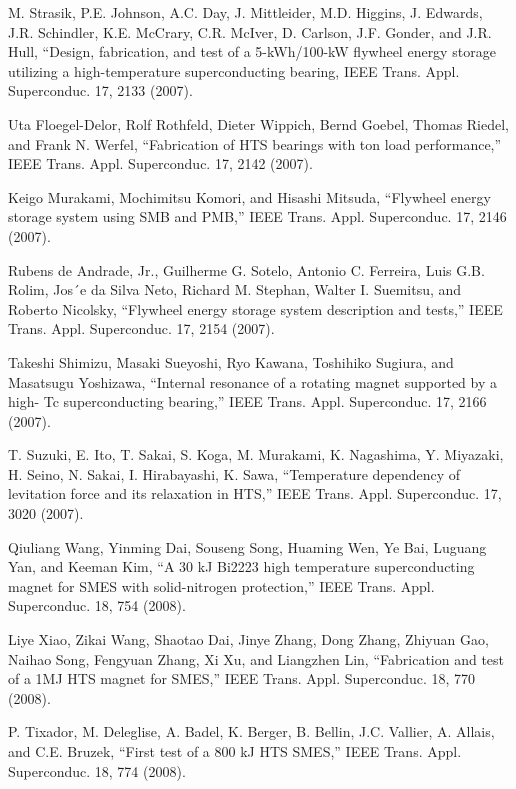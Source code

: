 \noindent [9.103] M. Strasik, P.E. Johnson, A.C. Day, J. Mittleider, M.D. Higgins, J. Edwards, J.R.
Schindler, K.E. McCrary, C.R. McIver, D. Carlson, J.F. Gonder, and J.R. Hull,
``Design, fabrication, and test of a 5-kWh/100-kW flywheel energy storage utilizing
a high-temperature superconducting bearing, IEEE Trans. Appl. Superconduc.
17, 2133 (2007).

\noindent [9.104] Uta Floegel-Delor, Rolf Rothfeld, Dieter Wippich, Bernd Goebel, Thomas Riedel,
and Frank N. Werfel, ``Fabrication of HTS bearings with ton load performance,”
IEEE Trans. Appl. Superconduc. 17, 2142 (2007).

\noindent [9.105] Keigo Murakami, Mochimitsu Komori, and Hisashi Mitsuda, ``Flywheel energy
storage system using SMB and PMB,” IEEE Trans. Appl. Superconduc. 17, 2146
(2007).

\noindent [9.106] Rubens de Andrade, Jr., Guilherme G. Sotelo, Antonio C. Ferreira, Luis G.B.
Rolim, Jos´e da Silva Neto, Richard M. Stephan, Walter I. Suemitsu, and Roberto
Nicolsky, ``Flywheel energy storage system description and tests,” IEEE Trans.
Appl. Superconduc. 17, 2154 (2007).

\noindent [9.107] Takeshi Shimizu, Masaki Sueyoshi, Ryo Kawana, Toshihiko Sugiura, and Masatsugu
Yoshizawa, ``Internal resonance of a rotating magnet supported by a high-
Tc superconducting bearing,” IEEE Trans. Appl. Superconduc. 17, 2166 (2007).

\noindent [9.108] T. Suzuki, E. Ito, T. Sakai, S. Koga, M. Murakami, K. Nagashima, Y. Miyazaki,
H. Seino, N. Sakai, I. Hirabayashi, K. Sawa, ``Temperature dependency of levitation
force and its relaxation in HTS,” IEEE Trans. Appl. Superconduc. 17, 3020
(2007).

\noindent [9.109] Qiuliang Wang, Yinming Dai, Souseng Song, Huaming Wen, Ye Bai, Luguang
Yan, and Keeman Kim, ``A 30 kJ Bi2223 high temperature superconducting magnet
for SMES with solid-nitrogen protection,” IEEE Trans. Appl. Superconduc.
18, 754 (2008).

\noindent [9.110] Liye Xiao, Zikai Wang, Shaotao Dai, Jinye Zhang, Dong Zhang, Zhiyuan Gao,
Naihao Song, Fengyuan Zhang, Xi Xu, and Liangzhen Lin, ``Fabrication and test
of a 1MJ HTS magnet for SMES,” IEEE Trans. Appl. Superconduc. 18, 770
(2008).

\noindent [9.111] P. Tixador, M. Deleglise, A. Badel, K. Berger, B. Bellin, J.C. Vallier, A. Allais, and
C.E. Bruzek, ``First test of a 800 kJ HTS SMES,” IEEE Trans. Appl. Superconduc.
18, 774 (2008).

